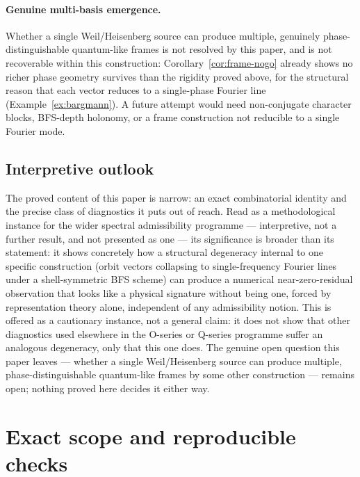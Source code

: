 \documentclass[11pt,a4paper]{article}
\begin{document}
    \paragraph{Genuine multi-basis emergence.}
      Whether a single Weil/Heisenberg source can produce multiple, genuinely phase-distinguishable
      quantum-like frames is not resolved by this paper, and is not recoverable within this
      construction: Corollary~\ref{cor:frame-nogo} already shows no richer phase geometry survives
      than the rigidity proved above, for the structural reason that each vector reduces to a
      single-phase Fourier line (Example~\ref{ex:bargmann}). A future attempt would need
      non-conjugate character blocks, BFS-depth holonomy, or a frame construction not reducible to a
      single Fourier mode.

  \subsection*{Interpretive outlook}

    The proved content of this paper is narrow: an exact combinatorial identity and the precise
    class of diagnostics it puts out of reach. Read as a methodological instance for the wider
    spectral admissibility programme --- interpretive, not a further result, and not presented as
    one --- its significance is broader than its statement: it shows concretely how a structural
    degeneracy internal to one specific construction (orbit vectors collapsing to single-frequency
    Fourier lines under a shell-symmetric BFS scheme) can produce a numerical near-zero-residual
    observation that looks like a physical signature without being one, forced by representation
    theory alone, independent of any admissibility notion. This is offered as a cautionary instance,
    not a general claim: it does not show that other diagnostics used elsewhere in the O-series or
    Q-series programme suffer an analogous degeneracy, only that this one does. The genuine open
    question this paper leaves --- whether a single Weil/Heisenberg source can produce multiple,
    phase-distinguishable quantum-like frames by some other construction --- remains open; nothing
    proved here decides it either way.

  \section{Exact scope and reproducible checks}
  \label{sec:falsifiability}
\end{document}
